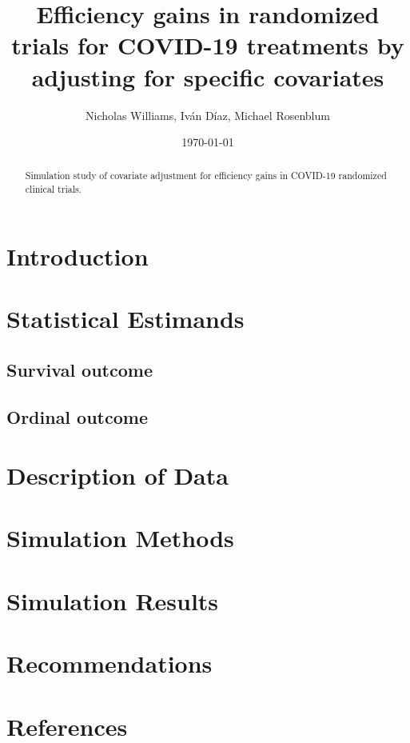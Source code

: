 \documentclass{article}
\title{
 {Efficiency gains in randomized trials for COVID-19 treatments by adjusting for specific covariates}\\
}
\author{Nicholas Williams, Iván Díaz, Michael Rosenblum}
\date{\today}
\begin{document}
\maketitle

\begin{abstract}
   Simulation study of covariate adjustment for efficiency gains in COVID-19 randomized clinical trials.
\end{abstract}

\section{Introduction}

\section{Statistical Estimands}

\subsection{Survival outcome}

\subsection{Ordinal outcome}

\section{Description of Data}

\section{Simulation Methods}

\section{Simulation Results}

\section{Recommendations}

\section{References}

\printbibliography

\appendix

\end{document}
